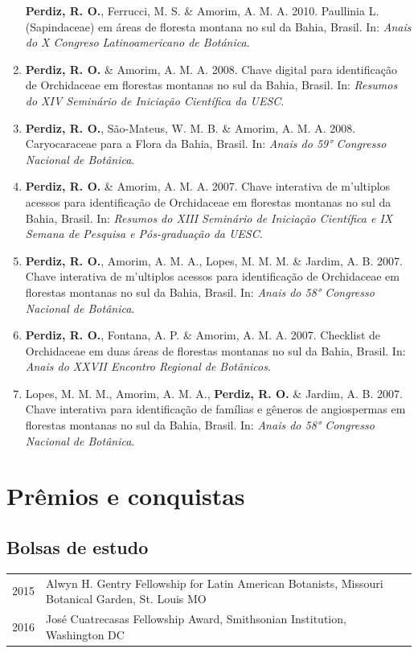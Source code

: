 \documentclass[11pt, a4paper]{awesome-cv}
\begin{document}
\begin{enumerate}
  \textbf{Perdiz, R. O.}, Ferrucci, M. S. \& Amorim, A. M. A. 2010. Paullinia L. (Sapindaceae) em áreas de floresta montana no sul da Bahia, Brasil. In: \emph{Anais do X Congreso Latinoamericano de Botánica}.
\item
  \textbf{Perdiz, R. O.} \& Amorim, A. M. A. 2008. Chave digital para identificação de Orchidaceae em florestas montanas no sul da Bahia, Brasil. In: \emph{Resumos do XIV Seminário de Iniciação Científica da UESC}.
\item
  \textbf{Perdiz, R. O.}, São-Mateus, W. M. B. \& Amorim, A. M. A. 2008. Caryocaraceae para a Flora da Bahia, Brasil. In: \emph{Anais do 59° Congresso Nacional de Botânica}.
\item
  \textbf{Perdiz, R. O.} \& Amorim, A. M. A. 2007. Chave interativa de m'ultiplos acessos para identificação de Orchidaceae em florestas montanas no sul da Bahia, Brasil. In: \emph{Resumos do XIII Seminário de Iniciação Científica e IX Semana de Pesquisa e Pós-graduação da UESC}.
\item
  \textbf{Perdiz, R. O.}, Amorim, A. M. A., Lopes, M. M. M. \& Jardim, A. B. 2007. Chave interativa de m'ultiplos acessos para identificação de Orchidaceae em florestas montanas no sul da Bahia, Brasil. In: \emph{Anais do 58° Congresso Nacional de Botânica}.
\item
  \textbf{Perdiz, R. O.}, Fontana, A. P. \& Amorim, A. M. A. 2007. Checklist de Orchidaceae em duas áreas de florestas montanas no sul da Bahia, Brasil. In: \emph{Anais do XXVII Encontro Regional de Botânicos}.
\item
  Lopes, M. M. M., Amorim, A. M. A., \textbf{Perdiz, R. O.} \& Jardim, A. B. 2007. Chave interativa para identificação de famílias e gêneros de angiospermas em florestas montanas no sul da Bahia, Brasil. In: \emph{Anais do 58° Congresso Nacional de Botânica}.
\end{enumerate}

\hypertarget{pruxeamios-e-conquistas}{%
\section{Prêmios e conquistas}\label{pruxeamios-e-conquistas}}

\hypertarget{bolsas-de-estudo}{%
\subsection{Bolsas de estudo}\label{bolsas-de-estudo}}

\begin{tabular}{rl}
  2015 & Alwyn H. Gentry Fellowship for Latin American Botanists, Missouri Botanical Garden, St. Louis MO \\ 
  2016 & José Cuatrecasas Fellowship Award, Smithsonian Institution, Washington DC \\ 
  \end{tabular}
\end{document}
